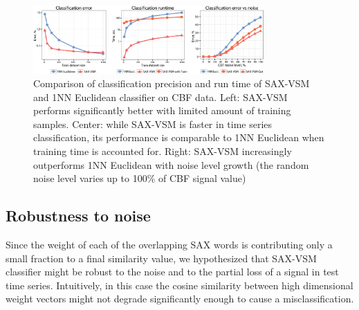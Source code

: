 \documentclass[conference]{IEEEtran}
\begin{document}
\begin{figure}[b]
   \centering
   \vspace{0.4cm}
   \includegraphics[width=88mm]{figures/precision-runtime_new.eps}
   \caption{Comparison of classification precision and run time of SAX-VSM and 1NN 
   Euclidean classifier on CBF data. 
   Left: SAX-VSM performs significantly better with limited amount of training samples. 
   Center: while SAX-VSM is faster in time series classification, its performance 
   is comparable to 1NN Euclidean when training time is accounted for.
   Right: SAX-VSM increasingly outperforms 1NN Euclidean with noise level growth 
   (the random noise level varies up to 100\% of CBF signal value)
   }
   \label{fig:precision-runtime}
   \vspace{-0.45cm}
\end{figure}


\subsection{Robustness to noise}
Since the weight of each of the overlapping SAX words is contributing only a small 
fraction to a final similarity value, we hypothesized that SAX-VSM classifier might be 
robust to the noise and to the partial loss of a signal in test time series. 
Intuitively, in this case the cosine similarity between high dimensional 
weight vectors might not degrade significantly enough to cause a misclassification.
\end{document}
